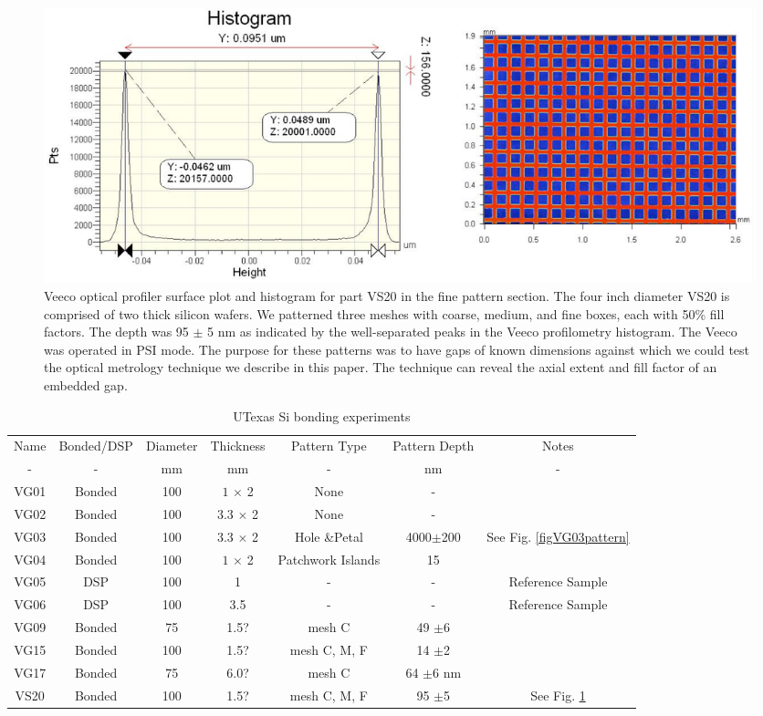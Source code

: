 \documentclass[osajnl,preprint,showpacs,superscriptaddress,12pt]{revtex4-1} %
\begin{document}
\begin{figure}[htbp]
\centerline{\includegraphics[width=1.0\columnwidth]{figs/VS20fineGapCrop.pdf}}
\caption{Veeco optical profiler surface plot and histogram for part VS20 in the fine pattern section\label{figVS20pattern}.  The four inch diameter VS20 is comprised of two thick silicon wafers.  We patterned three meshes with coarse, medium, and fine boxes, each with 50\% fill factors.  The depth was 95 $\pm$ 5 nm as indicated by the well-separated peaks in the Veeco profilometry histogram.  The Veeco was operated in PSI mode.  The purpose for these patterns was to have gaps of known dimensions against which we could test the optical metrology technique we describe in this paper.  The technique can reveal the axial extent and fill factor of an embedded gap.  }
\end{figure}


\begin{table}[h!]
\caption{UTexas Si bonding experiments \label{tabbondexper}}
\begin{center}
    \begin{tabular}{ c c c c c c c}
    \hline
    Name & Bonded/DSP & Diameter & Thickness & Pattern Type & Pattern Depth & Notes \\ 
    - & - & mm & mm & - & nm & - \\ 
        \hline
    VG01 & Bonded  & 100  &$1$ $\times$ 2 & None  & - &  \\
    VG02 & Bonded & 100 & $3.3$ $\times$ 2 &  None  & - &  \\
    VG03 & Bonded & 100 & $3.3$ $\times$ 2 &  Hole \&Petal & 4000$\pm$200 & See Fig. \ref{figVG03pattern}\\    
    VG04 & Bonded & 100 & $1$ $\times$ 2 &  Patchwork Islands & 15 & \\
    VG05 & DSP & 100 & 1&  - & - & Reference Sample  \\
    VG06 & DSP & 100 & 3.5 &  - & - & Reference Sample \\
    VG09 & Bonded & 75 & 1.5? & mesh C & 49 $\pm$6 & \\
    VG15 & Bonded & 100 & 1.5? &  mesh C, M, F  &14 $\pm$2 & \\
    VG17 & Bonded & 75 & 6.0? &  mesh C & 64 $\pm$6 nm & \\
    VS20 & Bonded & 100 & 1.5? &  mesh C, M, F & 95 $\pm$5 & See Fig. \ref{figVS20pattern}\\
    \hline
    \end{tabular}
\end{center}
\end{table}
\end{document}
